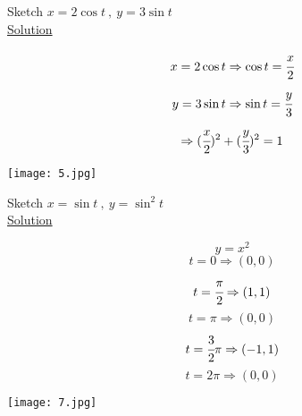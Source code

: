 \noindent{\color{smalt(darkpowderblue)}\rule{\linewidth}{.2mm}}
\begin{example}
Sketch $x=2\cos t~,~y=3\sin t$\\
\underline{\textbf{\large}\color{smalt(darkpowderblue)}Solution}\\
\begin{minipage}{0.5\textwidth}
$$x=2\cos t\Rightarrow \cos t=\cfrac{x}{2}$$
$$y=3\sin t\Rightarrow\sin t=\cfrac{y}{3}$$
$$\Rightarrow (\cfrac{x}{2})^2+(\cfrac{y}{3})^2=1$$
\end{minipage}
\begin{minipage}{0.5\textwidth}
\texttt{[image: 5.jpg]}
\end{minipage}
\end{example}
\begin{example}
Sketch $x=\sin t~,~y=\sin^2 t$\\
\underline{\textbf{\large}\color{smalt(darkpowderblue)}Solution} \\
\begin{minipage}{0.5\textwidth}
$$y=x^2$$
$$t=0\Rightarrow(0,0)$$
$$t=\cfrac{\pi}{2}\Rightarrow(1,1)$$
$$t=\pi\Rightarrow(0,0)$$
$$t=\cfrac{3}{2}\pi\Rightarrow(-1,1)$$
$$t=2\pi\Rightarrow(0,0)$$
\end{minipage}
\begin{minipage}{0.5\textwidth}
\texttt{[image: 7.jpg]}
\end{minipage}
\end{example}
\noindent{\color{smalt(darkpowderblue)}\rule{\linewidth}{.2mm}}
